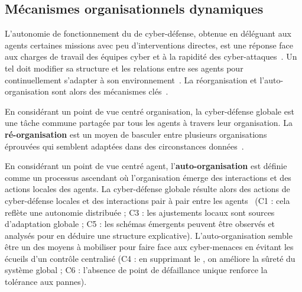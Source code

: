 \subsection{Mécanismes organisationnels dynamiques}

L'autonomie de fonctionnement du  de cyber-défense, obtenue en déléguant aux agents certaines missions avec peu d'interventions directes, est une réponse face aux charges de travail des équipes cyber et à la rapidité des cyber-attaques~\cite{ieeesp_KottT20}.
Un tel  doit modifier sa structure et les relations entre ses agents pour continuellement s'adapter à son environnement~\cite{theron_autonomous_2021}.
La réorganisation et l'auto-organisation sont alors des mécanismes clés~\cite{picard2009reorganisation}.

En considérant un point de vue centré organisation, la cyber-défense globale est une tâche commune partagée par tous les agents à travers leur organisation.
La \textbf{ré-organisation} est un moyen de basculer entre plusieurs organisations éprouvées qui semblent adaptées dans des circonstances données~\cite{picard2009reorganisation}.

En considérant un point de vue centré agent, l’\textbf{auto-organisation} est définie comme un processus ascendant où l’organisation émerge des interactions et des actions locales des agents.
La cyber-défense globale résulte alors des actions de cyber-défense locales et des interactions pair à pair entre les agents~\cite{picard2009reorganisation} (C1 : cela reflète une autonomie distribuée ; C3 : les ajustements locaux sont sources d’adaptation globale ; C5 : les schémas émergents peuvent être observés et analysés pour en déduire une structure explicative).
L'auto-organisation semble être un des moyens à mobiliser pour faire face aux cyber-menaces en évitant les écueils d'un contrôle centralisé (C4 : en supprimant le , on améliore la sûreté du système global ; C6 : l’absence de point de défaillance unique renforce la tolérance aux pannes).



